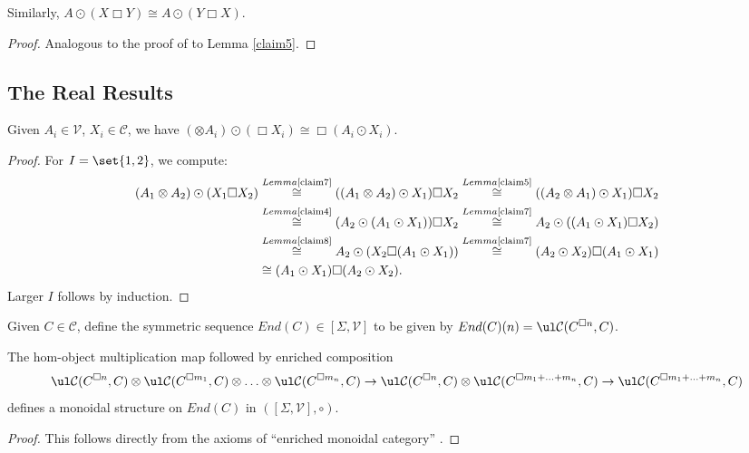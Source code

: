 \documentclass{report}
\renewcommand{\C}{\text{$\mathcal{C}$}}
\newcommand{\V}{\text{$\mathcal{V}$}}
\begin{document}
\begin{appendices}
\begin{lemma}
  \label{claim8}
Similarly, $A\odot(X\Box Y)\cong A\odot(Y\Box X)$.
\end{lemma}
\begin{proof}
  Analogous to the proof of to Lemma \ref{claim5}.
\end{proof}

\subsection{The Real Results}

\begin{prop}
  \label{lemma1}
Given $A_i\in\V$, $X_i\in \C$, we have $(\otimes A_i)\odot (\Box X_i) \cong \Box(A_i\odot X_i)$.
\end{prop}
\begin{proof}
  For $I = \set{1,2}$, we compute:
  \begin{align*}
    (A_1\otimes A_2)\odot(X_1\Box X_2) &\overset{\scriptsize{Lemma \ref{claim7}}}{\cong} ((A_1\otimes A_2)\odot X_1)\Box X_2 
    \overset{\scriptsize{Lemma \ref{claim5}}}{\cong}((A_2\otimes A_1)\odot X_1)\Box X_2\\
    &\overset{\scriptsize{Lemma \ref{claim4}}}{\cong}(A_2\odot (A_1\odot X_1))\Box X_2 
    \overset{\scriptsize{Lemma \ref{claim7}}}{\cong}A_2\odot((A_1\odot X_1)\Box X_2)\\
    &\overset{\scriptsize{Lemma \ref{claim8}}}{\cong}A_2\odot(X_2\Box (A_1\odot X_1))
    \overset{\scriptsize{Lemma \ref{claim7}}}{\cong}(A_2\odot X_2)\Box (A_1\odot X_1)\\
    &\cong (A_1\odot X_1)\Box (A_2\odot X_2).
  \end{align*}
Larger $I$ follows by induction.
\end{proof}

Given $C\in\C$, define the symmetric sequence $End(C)\in [\Sigma,\V]$ to be given by $End(C)(n) = \ul\C(C^{\Box n},C)$.

\begin{prop}
  \label{lemma2}
  The hom-object multiplication map followed by enriched composition
\[\ul\C(C^{\Box n},C)\otimes\ul\C(C^{\Box m_1},C)\otimes\ldots\otimes \ul\C(C^{\Box m_n},C) \to \ul\C(C^{\Box n},C)\otimes \ul\C(C^{\Box m_1+\ldots+m_n},C)\to \ul\C(C^{\Box m_1+\ldots+m_n},C)\]
defines a monoidal structure on $End(C)$ in $([\Sigma,\V],\circ)$. 
\end{prop}
\begin{proof}
  This follows directly from the axioms of ``enriched monoidal category''
.
\end{proof}


\end{appendices}
\end{document}
